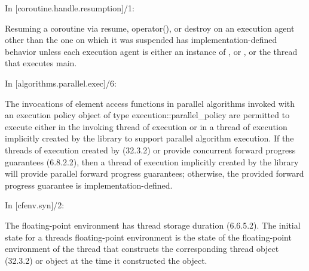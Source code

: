 

{\color{blue}
In [coroutine.handle.resumption]/1:
}

Resuming a coroutine via resume, operator(), or destroy on an execution agent other than the one on
which it was suspended has implementation-defined behavior unless each execution agent is either an instance
of 
{\color{insertcolor}
, or , 
}%
or the thread that executes main.


{\color{blue}
In [algorithms.parallel.exec]/6:
}

The invocations of element access functions in parallel algorithms invoked with an execution policy object
of type execution::parallel_policy are permitted to execute either in the invoking thread of execution
or in a thread of execution implicitly created by the library to support parallel algorithm execution. If the
threads of execution created by  (32.3.2) 
{\color{insertcolor}
or  
}%
provide concurrent forward progress guarantees (6.8.2.2),
then a thread of execution implicitly created by the library will provide parallel forward progress guarantees;
otherwise, the provided forward progress guarantee is implementation-defined.


{\color{blue}
In [cfenv.syn]/2:
}

The floating-point environment has thread storage duration (6.6.5.2). The initial state for a threads
floating-point environment is the state of the floating-point environment of the thread that constructs the
corresponding \tcode{}thread object (32.3.2) 
{\color{insertcolor}
or  object 
}%
at the time it constructed the object.




%
%

